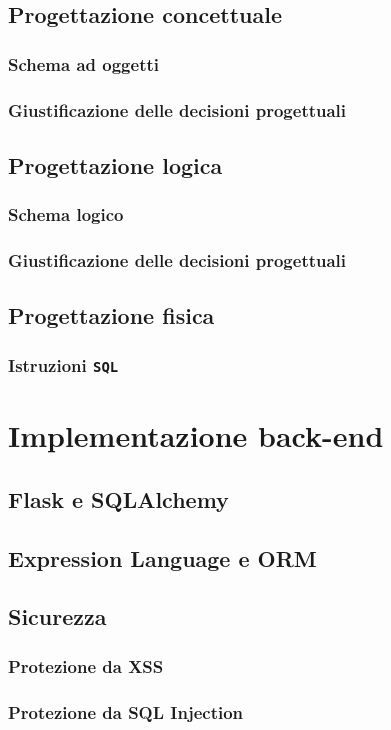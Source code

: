 \documentclass{report}
\begin{document}
\section{Progettazione concettuale}
\subsection{Schema ad oggetti}
\subsection{Giustificazione delle decisioni progettuali}
\section{Progettazione logica}
\subsection{Schema logico}
\subsection{Giustificazione delle decisioni progettuali}
\section{Progettazione fisica}
\subsection{Istruzioni \texttt{SQL}}


\chapter{Implementazione back-end}
\section{Flask e SQLAlchemy}
\section{Expression Language e ORM}
\section{Sicurezza}
\subsection{Protezione da XSS}
\subsection{Protezione da SQL Injection}
\end{document}
